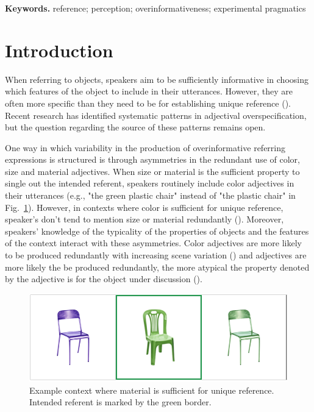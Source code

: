 \documentclass[12pt,letterpaper]{article}
\newenvironment{keywords}{%
\vspace{.5em}
\noindent\begin{minipage}{1\textwidth}
\setlength{\leftskip}{0.4in}
\setlength{\rightskip}{0.4in}
\textbf{Keywords.}}
{\end{minipage}}
\begin{document}
\begin{keywords} %
reference; perception; overinformativeness; experimental pragmatics
\end{keywords}

\section{Introduction} 

When referring to objects, speakers aim to be sufficiently informative in choosing which features of the object to include in their utterances. However, they are often more specific than they need to be for establishing unique reference (\citealt{Pechmann1989,GattEtAl2011,ArtsEtAl2011,KoolenEtAl2013}). Recent research has identified systematic patterns in adjectival overspecification, but the question regarding the source of these patterns remains open.

One way in which variability in the production of overinformative referring expressions is structured is through asymmetries in the redundant use of color, size and material adjectives. When size or material is the sufficient property to single out the intended referent, speakers routinely include color adjectives in their utterances (e.g., "the green plastic chair" instead of "the plastic chair" in Fig.~\ref{fig:chairs}). However, in contexts where color is sufficient for unique reference, speaker's don't tend to mention size or material redundantly (\citealt{Pechmann1989, Sedivy2003, GattEtAl2011, RubioFernandez2016, DegenEtAl2020}). Moreover, speakers' knowledge of the typicality of the properties of objects and the features of the context interact with these asymmetries. Color adjectives are more likely to be produced redundantly with increasing scene variation (\citealt{DegenEtAl2020, DaviesKatsos2013, KoolenEtAl2013}) and adjectives are more likely the be produced redundantly, the more atypical the property denoted by the adjective is for the object under discussion (\citealt{DegenEtAl2020, WesterbeekEtAl2015, Mitchell2013}).

\begin{figure}[ht]
   \centering
   \includegraphics[width=.7\textwidth]{img/chairs.png}
   \caption{Example context where material is sufficient for unique reference. Intended referent is marked by the green border.}
   \label{fig:chairs}
\end{figure}
\end{document}

